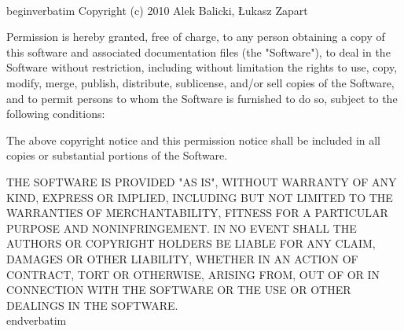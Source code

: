 \\begin{verbatim}
 Copyright (c) 2010 Alek Balicki, Łukasz Zapart

 Permission is hereby granted, free of charge, to any person
 obtaining a copy of this software and associated documentation
 files (the "Software"), to deal in the Software without
 restriction, including without limitation the rights to use,
 copy, modify, merge, publish, distribute, sublicense, and/or sell
 copies of the Software, and to permit persons to whom the
 Software is furnished to do so, subject to the following
 conditions:

 The above copyright notice and this permission notice shall be
 included in all copies or substantial portions of the Software.

 THE SOFTWARE IS PROVIDED "AS IS", WITHOUT WARRANTY OF ANY KIND,
 EXPRESS OR IMPLIED, INCLUDING BUT NOT LIMITED TO THE WARRANTIES
 OF MERCHANTABILITY, FITNESS FOR A PARTICULAR PURPOSE AND
 NONINFRINGEMENT. IN NO EVENT SHALL THE AUTHORS OR COPYRIGHT
 HOLDERS BE LIABLE FOR ANY CLAIM, DAMAGES OR OTHER LIABILITY,
 WHETHER IN AN ACTION OF CONTRACT, TORT OR OTHERWISE, ARISING
 FROM, OUT OF OR IN CONNECTION WITH THE SOFTWARE OR THE USE OR
 OTHER DEALINGS IN THE SOFTWARE.
\\end{verbatim}
